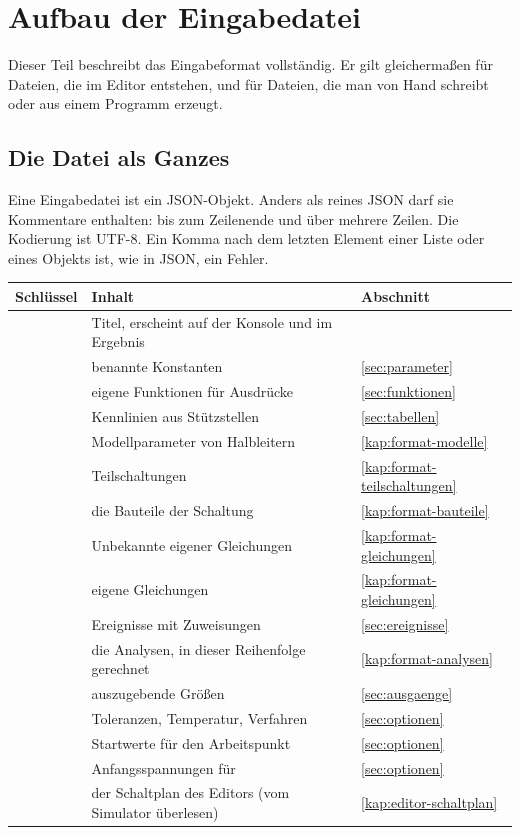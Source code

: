 \chapter{Aufbau der Eingabedatei}
\label{kap:format-grundlagen}

Dieser Teil beschreibt das Eingabeformat vollständig. Er gilt gleichermaßen
für Dateien, die im Editor entstehen, und für Dateien, die man von Hand
schreibt oder aus einem Programm erzeugt.

\section{Die Datei als Ganzes}

Eine Eingabedatei ist ein JSON-Objekt. Anders als reines JSON darf sie
Kommentare enthalten: \code{//} bis zum Zeilenende und 
über mehrere Zeilen. Die Kodierung ist UTF-8. Ein Komma nach dem letzten
Element einer Liste oder eines Objekts ist, wie in JSON, ein Fehler.

\begin{center}
\begin{tabularx}{\textwidth}{@{}lLl@{}}
  \toprule
  Schlüssel & Inhalt & Abschnitt \\
  \midrule
   & Titel, erscheint auf der Konsole und im Ergebnis & \\
   & benannte Konstanten & \ref{sec:parameter} \\
   & eigene Funktionen für Ausdrücke & \ref{sec:funktionen} \\
   & Kennlinien aus Stützstellen & \ref{sec:tabellen} \\
   & Modellparameter von Halbleitern & \ref{kap:format-modelle} \\
   & Teilschaltungen & \ref{kap:format-teilschaltungen} \\
   & die Bauteile der Schaltung & \ref{kap:format-bauteile} \\
   & Unbekannte eigener Gleichungen & \ref{kap:format-gleichungen} \\
   & eigene Gleichungen & \ref{kap:format-gleichungen} \\
   & Ereignisse mit Zuweisungen & \ref{sec:ereignisse} \\
   & die Analysen, in dieser Reihenfolge gerechnet & \ref{kap:format-analysen} \\
   & auszugebende Größen & \ref{sec:ausgaenge} \\
   & Toleranzen, Temperatur, Verfahren & \ref{sec:optionen} \\
   & Startwerte für den Arbeitspunkt & \ref{sec:optionen} \\
   & Anfangsspannungen für  & \ref{sec:optionen} \\
   & der Schaltplan des Editors (vom Simulator überlesen) & \ref{kap:editor-schaltplan} \\
  \bottomrule
\end{tabularx}
\end{center}


